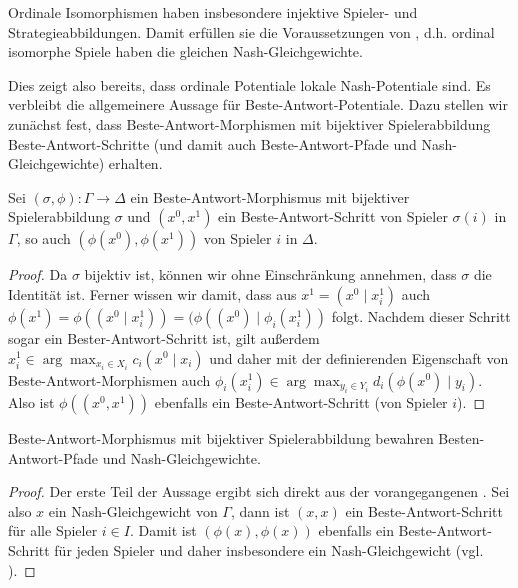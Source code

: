 \begin{bsp}
	Ordinale Isomorphismen haben insbesondere injektive Spieler- und Strategieabbildungen. Damit erfüllen sie die Voraussetzungen von , d.h. ordinal isomorphe Spiele haben die gleichen Nash-Gleichgewichte.
\end{bsp}

Dies zeigt also bereits, dass ordinale Potentiale lokale Nash-Potentiale sind. Es verbleibt die allgemeinere Aussage für Beste-Antwort-Potentiale. Dazu stellen wir zunächst fest, dass Beste-Antwort-Morphismen mit bijektiver Spielerabbildung Beste-Antwort-Schritte (und damit auch Beste-Antwort-Pfade und Nash-Gleichgewichte) erhalten.

\begin{prop}\label{prop:BAMorphErhBASchritte}
	Sei $(\sigma, \phi): \Gamma \to \Delta$ ein Beste-Antwort-Morphismus mit bijektiver Spielerabbildung $\sigma$ und $(x^0, x^1)$ ein Beste-Antwort-Schritt von Spieler $\sigma(i)$ in $\Gamma$, so auch $(\phi(x^0), \phi(x^1))$ von Spieler $i$ in $\Delta$.
\end{prop}

\begin{proof}
	Da $\sigma$ bijektiv ist, können wir ohne Einschränkung annehmen, dass $\sigma$ die Identität ist. Ferner wissen wir damit, dass aus $x^1 = (x^0 \mid x^1_i)$ auch $\phi(x^1) = \phi((x^0 \mid x^1_i)) = (\phi((x^0) \mid \phi_i(x^1_i))$ folgt. Nachdem dieser Schritt sogar ein Bester-Antwort-Schritt ist, gilt außerdem $x^1_i \in \arg\max_{x_i \in X_i} c_i(x^0 \mid x_i)$ und daher mit der definierenden Eigenschaft von Beste-Antwort-Morphismen auch $\phi_i(x^1_i) \in \arg\max_{y_i \in Y_i} d_i(\phi(x^0) \mid y_i)$. Also ist $\phi((x^0, x^1))$ ebenfalls ein Beste-Antwort-Schritt (von Spieler $i$).
\end{proof}

\begin{kor}
	Beste-Antwort-Morphismus mit bijektiver Spielerabbildung bewahren Besten-Antwort-Pfade und Nash-Gleichgewichte.
\end{kor}

\begin{proof}
	Der erste Teil der Aussage ergibt sich direkt aus der vorangegangenen . Sei also $x$ ein Nash-Gleichgewicht von $\Gamma$, dann ist $(x,x)$ ein Beste-Antwort-Schritt für alle Spieler $i \in I$. Damit ist $(\phi(x), \phi(x))$ ebenfalls ein Beste-Antwort-Schritt für jeden Spieler und daher insbesondere ein Nash-Gleichgewicht (vgl. ).
\end{proof}

